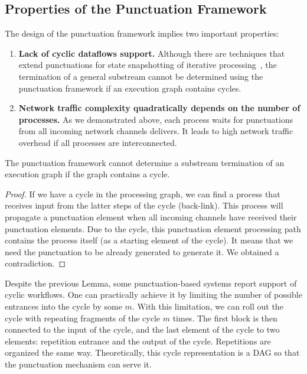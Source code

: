 \subsection{Properties of the Punctuation Framework}

The design of the punctuation framework implies two important properties:

\begin{enumerate}
    \item {\bf Lack of cyclic dataflows support.} Although there are techniques that extend punctuations for state snapshotting of iterative processing~\cite{Carbone:2017:SMA:3137765.3137777}, the termination of a general substream cannot be determined using the punctuation framework if an execution graph contains cycles.
    \item {\bf Network traffic complexity quadratically depends on the number of processes.} As we demonstrated above, each process waits for punctuations from all incoming network channels delivers. It leads to high network traffic overhead if all processes are interconnected.
\end{enumerate}

\begin{lemma}
The punctuation framework cannot determine a substream termination of an execution graph if the graph contains a cycle.
\end{lemma}
\begin{proof}
If we have a cycle in the processing graph, we can find a process that receives input from the latter steps of the cycle (back-link). This process will propagate a punctuation element when all incoming channels have received their punctuation elements. Due to the cycle, this punctuation element processing path contains the process itself (as a starting element of the cycle). It means that we need the punctuation to be already generated to generate it. We obtained a contradiction.
\end{proof}

Despite the previous Lemma, some punctuation-based systems report support of cyclic workflows. One can practically achieve it by limiting the number of possible entrances into the cycle by some $m$. With this limitation, we can roll out the cycle with repeating fragments of the cycle $m$ times. The first block is then connected to the input of the cycle, and the last element of the cycle to two elements: repetition entrance and the output of the cycle. Repetitions are organized the same way. Theoretically, this cycle representation is a DAG so that the punctuation mechanism can serve it.

